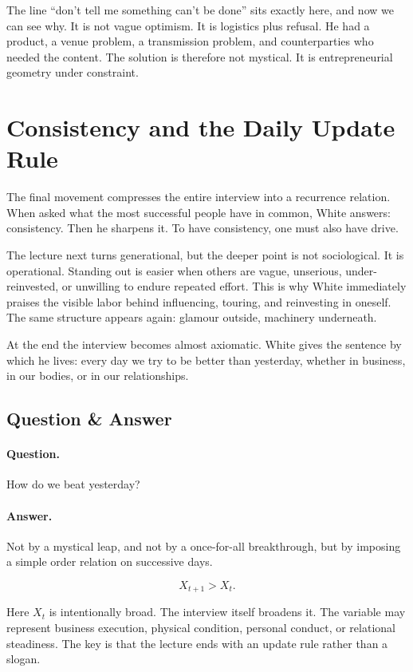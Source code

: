 The line ``don't tell me something can't be done'' sits exactly here, and now we can see why. It is not vague optimism. It is logistics plus refusal. He had a product, a venue problem, a transmission problem, and counterparties who needed the content. The solution is therefore not mystical. It is entrepreneurial geometry under constraint.

\section{Consistency and the Daily Update Rule}

The final movement compresses the entire interview into a recurrence relation. When asked what the most successful people have in common, White answers: consistency. Then he sharpens it. To have consistency, one must also have drive.

The lecture next turns generational, but the deeper point is not sociological. It is operational. Standing out is easier when others are vague, unserious, under-reinvested, or unwilling to endure repeated effort. This is why White immediately praises the visible labor behind influencing, touring, and reinvesting in oneself. The same structure appears again: glamour outside, machinery underneath.

At the end the interview becomes almost axiomatic. White gives the sentence by which he lives: every day we try to be better than yesterday, whether in business, in our bodies, or in our relationships.

\subsection{Question \& Answer}

\paragraph{Question.}
How do we beat yesterday?

\paragraph{Answer.}
Not by a mystical leap, and not by a once-for-all breakthrough, but by imposing a simple order relation on successive days.

\begin{equation}
X_{t+1} > X_t.
\end{equation}

Here \(X_t\) is intentionally broad. The interview itself broadens it. The variable may represent business execution, physical condition, personal conduct, or relational steadiness. The key is that the lecture ends with an update rule rather than a slogan.

